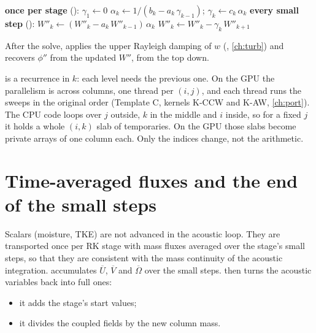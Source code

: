 \begin{algorithm}[ht]
\caption{The tridiagonal solve for $W''$ in one column.  computes the factors once per stage;
 performs the two sweeps every small step.}
\label{alg:tridiag}
\begin{algorithmic}[1]
\State \textbf{once per stage} ():
\State $\gamma_1 \gets 0$
 
  \State $\alpha_k \gets 1 / (b_k - a_k\,\gamma_{k-1})$; \quad $\gamma_k \gets c_k\,\alpha_k$
\EndFor
\State \textbf{every small step} ():
 
  \State $W''_k \gets (W''_k - a_k\,W''_{k-1})\,\alpha_k$
\EndFor
{} 
  \State $W''_k \gets W''_k - \gamma_k\,W''_{k+1}$
\EndFor
\end{algorithmic}
\end{algorithm}

After the solve,  applies the upper Rayleigh damping of $w$ (, \cref{ch:turb})
and recovers $\phi''$ from the updated $W''$, from the top down.

\begin{portnote}
 is a recurrence in $k$: each level needs the previous one. On the GPU the parallelism is across
columns, one thread per $(i,j)$, and each thread runs the sweeps in the original order (Template C, kernels K-CCW and
K-AW, \cref{ch:port}). The CPU code loops over $j$ outside, $k$ in the middle and $i$ inside, so for a fixed $j$ it
holds a whole $(i,k)$ slab of temporaries. On the GPU those slabs become private arrays of one column each. Only
the indices change, not the arithmetic.
\end{portnote}

\section{Time-averaged fluxes and the end of the small steps}

Scalars (moisture, TKE) are not advanced in the acoustic loop. They are transported once per RK stage with mass
fluxes averaged over the stage's small steps, so that they are consistent with the mass continuity of the acoustic
integration.  accumulates $\overline{U}$, $\overline{V}$ and
$\overline{\Omega}$ over the small steps.  then turns the
acoustic variables back into full ones:
\begin{itemize}
  \item it adds the stage's start values;
  \item it divides the coupled fields by the new column mass.
\end{itemize}

